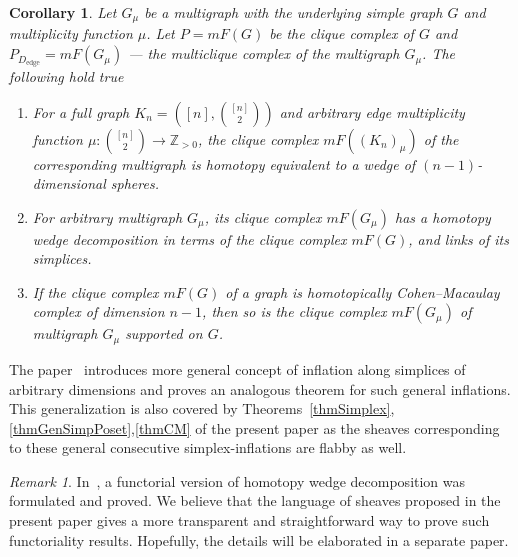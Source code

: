 \documentclass[english,12pt,oneside]{amsproc}
\DeclareMathOperator{\edge}{edge}
\newcommand{\Zo}{\mathbb{Z}}
\newcounter{stmcounter}[section]
\numberwithin{equation}{section}
\theoremstyle{plain}
\newtheorem{cor}[stmcounter]{Corollary}
\theoremstyle{definition}
\theoremstyle{remark}
\newtheorem{rem}[stmcounter]{Remark}
\begin{document}
\begin{cor}
Let $G_\mu$ be a multigraph with the underlying simple graph $G$ and multiplicity function $\mu$. Let $P=mF(G)$ be the clique complex of $G$ and $P_{D_{\edge}}=mF(G_\mu)$ --- the multiclique complex of the multigraph $G_\mu$. The following hold true
\begin{enumerate}
  \item For a full graph $K_n=\left([n],{[n]\choose 2}\right)$ and arbitrary edge multiplicity function $\mu\colon {[n]\choose 2}\to \Zo_{>0}$, the clique complex $mF((K_n)_\mu)$ of the corresponding multigraph is homotopy equivalent to a wedge of $(n-1)$-dimensional spheres.
  \item For arbitrary multigraph $G_\mu$, its clique complex $mF(G_\mu)$ has a homotopy wedge decomposition in terms of the clique complex $mF(G)$, and links of its simplices.
  \item If the clique complex $mF(G)$ of a graph is homotopically Cohen--Macaulay complex of dimension $n-1$, then so is the clique complex $mF(G_\mu)$ of multigraph $G_\mu$ supported on $G$.
\end{enumerate}
\end{cor}

The paper~\cite{AyzRukh} introduces more general concept of inflation along simplices of arbitrary dimensions and proves an analogous theorem for such general inflations. This generalization is also covered by Theorems~\ref{thmSimplex},\ref{thmGenSimpPoset},\ref{thmCM} of the present paper as the sheaves corresponding to these general consecutive simplex-inflations are flabby as well.

\begin{rem}
In~\cite{AyzRukh}, a functorial version of homotopy wedge decomposition was formulated and proved. We believe that the language of sheaves proposed in the present paper gives a more transparent and straightforward way to prove such functoriality results. Hopefully, the details will be elaborated in a separate paper.
\end{rem}
\end{document}
